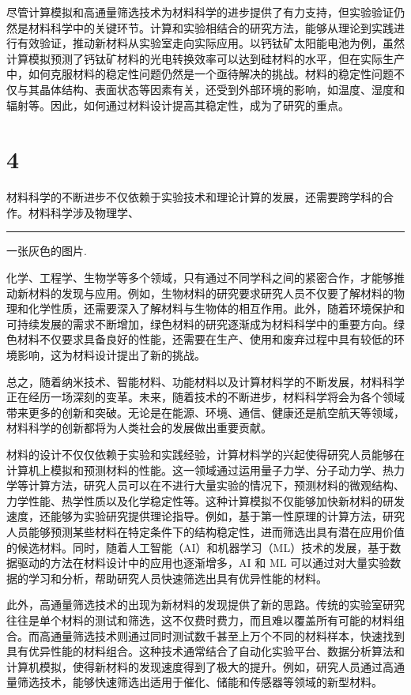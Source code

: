 \begin{multicols}{2}
尽管计算模拟和高通量筛选技术为材料科学的进步提供了有力支持，但实验验证仍然是材料科学中的关键环节。计算和实验相结合的研究方法，能够从理论到实践进行有效验证，推动新材料从实验室走向实际应用。以钙钛矿太阳能电池为例，虽然计算模拟预测了钙钛矿材料的光电转换效率可以达到硅材料的水平，但在实际生产中，如何克服材料的稳定性问题仍然是一个亟待解决的挑战。材料的稳定性问题不仅与其晶体结构、表面状态等因素有关，还受到外部环境的影响，如温度、湿度和辐射等。因此，如何通过材料设计提高其稳定性，成为了研究的重点。

\section{4}
材料科学的不断进步不仅依赖于实验技术和理论计算的发展，还需要跨学科的合作。材料科学涉及物理学、
\begin{hfigure}\centering
    \color{gray}\rule{7cm}{150pt}
    \caption{一张灰色的图片.}
\end{hfigure}
化学、工程学、生物学等多个领域，只有通过不同学科之间的紧密合作，才能够推动新材料的发现与应用。例如，生物材料的研究要求研究人员不仅要了解材料的物理和化学性质，还需要深入了解材料与生物体的相互作用。此外，随着环境保护和可持续发展的需求不断增加，绿色材料的研究逐渐成为材料科学中的重要方向。绿色材料不仅要求具备良好的性能，还需要在生产、使用和废弃过程中具有较低的环境影响，这为材料设计提出了新的挑战。

总之，随着纳米技术、智能材料、功能材料以及计算材料学的不断发展，材料科学正在经历一场深刻的变革。未来，随着技术的不断进步，材料科学将会为各个领域带来更多的创新和突破。无论是在能源、环境、通信、健康还是航空航天等领域，材料科学的创新都将为人类社会的发展做出重要贡献。

材料的设计不仅仅依赖于实验和实践经验，计算材料学的兴起使得研究人员能够在计算机上模拟和预测材料的性能。这一领域通过运用量子力学、分子动力学、热力学等计算方法，研究人员可以在不进行大量实验的情况下，预测材料的微观结构、力学性能、热学性质以及化学稳定性等。这种计算模拟不仅能够加快新材料的研发速度，还能够为实验研究提供理论指导。例如，基于第一性原理的计算方法，研究人员能够预测某些材料在特定条件下的结构稳定性，进而筛选出具有潜在应用价值的候选材料。同时，随着人工智能（AI）和机器学习（ML）技术的发展，基于数据驱动的方法在材料设计中的应用也逐渐增多，AI 和 ML 可以通过对大量实验数据的学习和分析，帮助研究人员快速筛选出具有优异性能的材料。

此外，高通量筛选技术的出现为新材料的发现提供了新的思路。传统的实验室研究往往是单个材料的测试和筛选，这不仅费时费力，而且难以覆盖所有可能的材料组合。而高通量筛选技术则通过同时测试数千甚至上万个不同的材料样本，快速找到具有优异性能的材料组合。这种技术通常结合了自动化实验平台、数据分析算法和计算机模拟，使得新材料的发现速度得到了极大的提升。例如，研究人员通过高通量筛选技术，能够快速筛选出适用于催化、储能和传感器等领域的新型材料。


\end{multicols}
